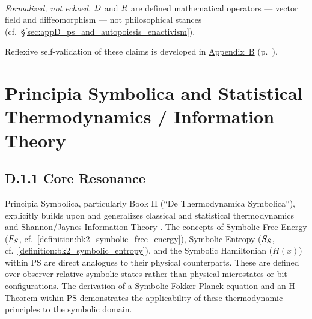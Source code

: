 \begin{tcolorbox}
\begin{description}[leftmargin=0pt, itemsep=6pt]
    \item[\textbf{Enactivism / Autopoiesis}] \hfill \\
    \textit{Formalized, not echoed.}
    $D$ and $R$ are defined mathematical operators --- vector field and diffeomorphism ---
    not philosophical stances (cf.~\S\ref{sec:appD_ps_and_autopoiesis_enactivism}).
\end{description}

\medskip
\noindent Reflexive self-validation of these claims is developed in
\hyperref[sec:appB_overview]{Appendix~B} (p.~\pageref{sec:appB_overview}).
\end{tcolorbox}

\section*{Principia Symbolica and Statistical Thermodynamics / Information Theory}
\label{sec:appD_ps_and_stat_thermo_info_theory}
\subsection*{D.1.1 Core Resonance}
\label{subsec:appD_core_resonance}
Principia Symbolica, particularly Book II (``De Thermodynamica Symbolica''), explicitly builds upon and generalizes classical and statistical thermodynamics \cite{callen1985thermodynamics} and Shannon/Jaynes Information Theory \cite{shannon1948}. The concepts of Symbolic Free Energy (\(F_S\), cf.~\ref{definition:bk2_symbolic_free_energy}), Symbolic Entropy (\(S_S\), cf.~\ref{definition:bk2_symbolic_entropy}), and the Symbolic Hamiltonian (\(H(x)\)) within PS are direct analogues to their physical counterparts. These are defined over observer-relative symbolic states rather than physical microstates or bit configurations. The derivation of a Symbolic Fokker-Planck equation and an H-Theorem within PS demonstrates the applicability of these thermodynamic principles to the symbolic domain.
